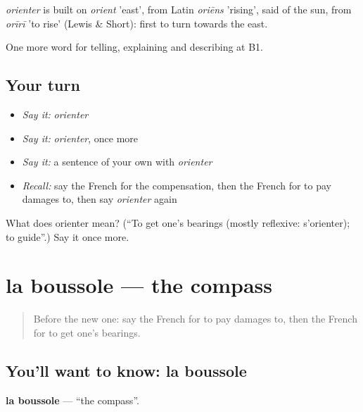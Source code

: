 \begin{cousinweb}
\emph{orienter} is built on \emph{orient} 'east', from Latin \emph{oriēns} 'rising', said of the sun, from \emph{orīrī} 'to rise' (Lewis \& Short): first to turn towards the east.
\end{cousinweb}

\begin{grammarlens}[title={What you've built}]
One more word for telling, explaining and describing at B1.
\end{grammarlens}

\subsection*{Your turn}
\begin{itemize}
\raggedright
  \item \emph{Say it:} \emph{orienter}
  \item \emph{Say it:} \emph{orienter}, once more
  \item \emph{Say it:} a sentence of your own with \emph{orienter}
  \item \emph{Recall:} say the French for the compensation, then the French for to pay damages to, then say \emph{orienter} again
\end{itemize}

\begin{tcolorbox}[breakable,colback=teal!4,colframe=teal!35!black,title={Before you move on}]
What does orienter mean? (\textquotedblleft{}To get one’s bearings (mostly reflexive: s’orienter); to guide\textquotedblright{}.) Say it once more.
\end{tcolorbox}
\section[la boussole]{la boussole — the compass}

\label{lesson:FR-C434-boussole}



\begin{quote}
Before the new one: say the French for to pay damages to, then the French for to get one’s bearings.
\end{quote}

\subsection*{You'll want to know: la boussole}
\textbf{la boussole} — \textquotedblleft{}the compass\textquotedblright{}.

